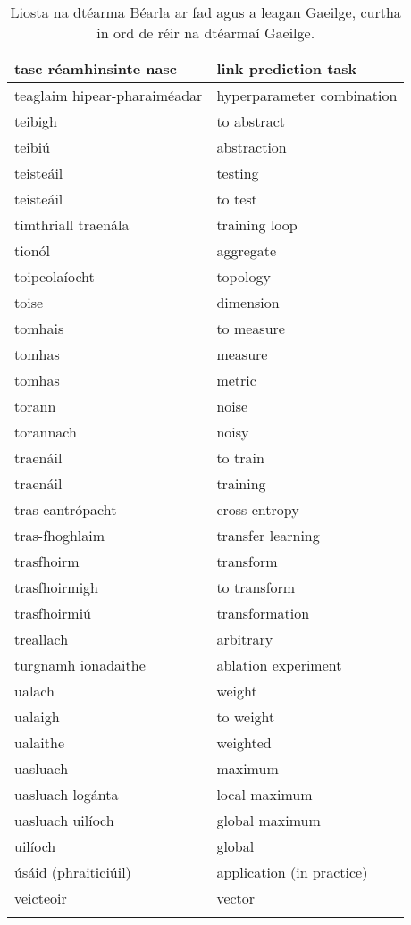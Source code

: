 \begin{longtable}{|l|l|}
		tasc réamhinsinte nasc&link prediction task\\ \hline 
		teaglaim hipear-pharaiméadar&hyperparameter combination\\ \hline 
		teibigh&to abstract\\ \hline 
		teibiú&abstraction\\ \hline 
		teisteáil&testing\\ \hline 
		teisteáil&to test\\ \hline 
		timthriall traenála&training loop\\ \hline 
		tionól&aggregate\\ \hline 
		toipeolaíocht&topology\\ \hline 
		toise&dimension\\ \hline 
		tomhais&to measure\\ \hline 
		tomhas&measure\\ \hline 
		tomhas&metric\\ \hline 
		torann&noise\\ \hline 
		torannach&noisy\\ \hline 
		traenáil&to train\\ \hline 
		traenáil&training\\ \hline 
		tras-eantrópacht&cross-entropy\\ \hline 
		tras-fhoghlaim&transfer learning\\ \hline 
		trasfhoirm&transform\\ \hline 
		trasfhoirmigh&to transform\\ \hline 
		trasfhoirmiú&transformation\\ \hline 
		treallach&arbitrary\\ \hline 
		turgnamh ionadaithe&ablation experiment\\ \hline 
		ualach&weight\\ \hline 
		ualaigh&to weight\\ \hline 
		ualaithe&weighted\\ \hline 
		uasluach&maximum\\ \hline 
		uasluach logánta&local maximum\\ \hline 
		uasluach uilíoch&global maximum\\ \hline 
		uilíoch&global\\ \hline 
		úsáid (phraiticiúil)&application (in practice)\\ \hline 
		veicteoir&vector\\ \hline 
\caption{Liosta na dtéarma Béarla ar fad agus a leagan Gaeilge, curtha in ord de réir na dtéarmaí Gaeilge.}
\label{tab-terms-ga-en}
\end{longtable}

